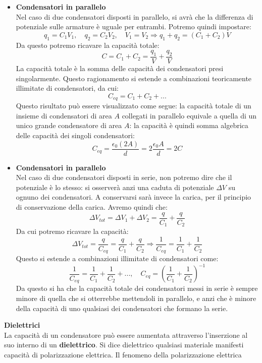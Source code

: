 \documentclass[a4paper,12pt]{article}
\begin{document}
\begin{itemize}
  \item \textbf{Condensatori in parallelo} \\
    Nel caso di due condensatori disposti in parallelo, si avrà che la differenza di potenziale sulle armature è uguale per entrambi. Potremo quindi impostare:
    $$ q_1 = C_1 V_1, \quad q_2 = C_2 V_2, \quad V_1 = V_2 \Rightarrow q_1+q_2 = (C_1+C_2)V $$
    Da questo potremo ricavare la capacità totale:
    $$ C = C_1 + C_2 = \frac{q_1}{V} + \frac{q_2}{V} $$
    La capacità totale è la somma delle capacità dei condensatori presi singolarmente.
    Questo ragionamento si estende a combinazioni teoricamente illimitate di condensatori, da cui:
    $$ C_{eq} = C_1+C_2+...$$
    Questo risultato può essere visualizzato come segue: la capacità totale di un insieme di condensatori di area $A$ collegati in parallelo equivale a quella di un unico grande condensatore di area $A$:
    la capacità è quindi somma algebrica delle capacità dei singoli condensatori:
    $$ C_{eq} = \frac{\epsilon_0 (2A)}{d} = 2 \frac{\epsilon_0A}{d} = 2C $$
  \item \textbf{Condensatori in parallelo} \\
    Nel caso di due condensatori disposti in serie, non potremo dire che il potenziale è lo stesso: si osserverà anzi una caduta di potenziale $\Delta V$ su ognuno dei condensatori. A conservarsi sarà invece la carica,
    per il principio di conservazione della carica. Avremo quindi che:
    $$ \Delta V_{tot} = \Delta V_1 + \Delta V_2 = \frac{q}{C_1} + \frac{q}{C_2} $$
    Da cui potremo ricavare la capacità:
    $$ \Delta V_{tot} = \frac{q}{C_{eq}} = \frac{q}{C_1} + \frac{q}{C_2} \Rightarrow \frac{1}{C_{eq}} = \frac{1}{C_1} + \frac{1}{C_2} $$
    Questo si estende a combinazioni illimitate di condensatori come:
    $$ \frac{1}{C_{eq}} = \frac{1}{C_1} + \frac{1}{C_2} + ..., \quad C_{eq} = \left( \frac{1}{C_1} + \frac{1}{C_2} \right)^{-1} $$
    Da questo si ha che la capacità totale dei condensatori messi in serie è sempre minore di quella che si otterrebbe mettendoli in parallelo, e anzi che è minore della capacità di uno qualsiasi dei condensatori che formano
    la serie.
\end{itemize}
\par\smallskip
\textbf{Dielettrici} \\
La capacità di un condensatore può essere aumentata attraverso l'inserzione al suo interno di un \textbf{dielettrico}. Si dice dielettrico qualsiasi materiale manifesti capacità di polarizzazione elettrica. Il fenomeno della polarizzazione elettrica
\end{document}
